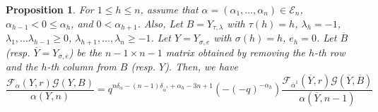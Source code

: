 \documentclass[11pt,oneside]{amsart}
\theoremstyle{plain}
\newtheorem{proposition}[theorem]{Proposition}
\theoremstyle{definition}
\theoremstyle{remark}
\newcommand{\CE}{{\mathcal E}}
\newcommand{\CF}{{\mathcal F}}
\newcommand{\CG}{{\mathcal G}}
\numberwithin{equation}{section}
\begin{document}
	
	\begin{proposition}\label{proposition2.17}
		For $1 \leq h \leq n$, assume that $\alpha=(\alpha_1,\dots,\alpha_n) \in \CE_n$, $\alpha_{h-1} < 0 \leq \alpha_h$, and $0<\alpha_{h+1}$. Also, Let $B=Y_{\tau, \lambda}$ with $\tau(h)=h$, $\lambda_h=-1$,  $\lambda_1,\dots \lambda_{h-1} \geq 0$, $\lambda_{h+1},\dots,\lambda_n \geq -1$. Let $Y=Y_{\sigma,e}$ with $\sigma(h)=h$, $e_h=0$. Let $\overline{B}$ (resp. $\overline{Y}=Y_{\overline{\sigma},\overline{e}}$) be the $n-1 \times n-1$ matrix obtained by removing the $h$-th row and the $h$-th column from $B$ (resp. $Y$). Then, we have
		\begin{equation*}
			\dfrac{\CF_{\alpha}(Y,r)\CG(Y,B)}{\alpha(Y,n)}=q^{n\delta_{\alpha}-(n-1)\delta_{\overline{\alpha}^1}+\alpha_h-3n+1}(-(-q)^{-\alpha_h})\dfrac{\CF_{\overline{\alpha}^1}(\overline{Y},r)\CG(\overline{Y},\overline{B})}{\alpha(\overline{Y},n-1)}
		\end{equation*}
		
	\end{proposition}
\end{document}
